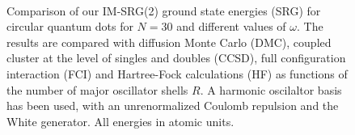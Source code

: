 \begin{figure}
  \centering
    \\
   
  \caption{Comparison of our IM-SRG(2) ground state energies (SRG)
    for circular quantum dots for $N=30$ and different values of
    $\omega$. The results are compared with diffusion Monte
    Carlo (DMC), coupled cluster at the level of singles and doubles
    (CCSD), full configuration interaction (FCI) and Hartree-Fock
    calculations (HF) as functions of the number of major oscillator
    shells $R$. A harmonic oscilaltor basis has been used, with an
    unrenormalized Coulomb repulsion and the White generator. All
    energies in atomic units.}
  \label{fig:N30}
\end{figure}


